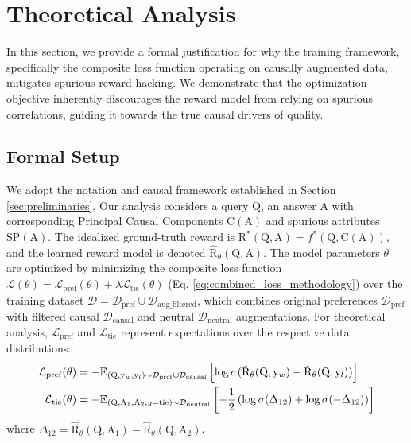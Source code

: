 \section{Theoretical Analysis}
\label{sec:theoretical_analysis_detailed}

In this section, we provide a formal justification for why the \carma{} training framework, specifically the composite loss function operating on causally augmented data, mitigates spurious reward hacking. We demonstrate that the optimization objective inherently discourages the reward model from relying on spurious correlations, guiding it towards the true causal drivers of quality.

\subsection{Formal Setup}
\label{subsec:theory_setup}

We adopt the notation and causal framework established in Section \ref{sec:preliminaries}. Our analysis considers a query $\mathrm{Q}$, an answer $\mathrm{A}$ with corresponding Principal Causal Components $\mathrm{C}(\mathrm{A})$ and spurious attributes $\mathrm{SP}(\mathrm{A})$. The idealized ground-truth reward is $\mathrm{R}^*(\mathrm{Q}, \mathrm{A}) = f^*(\mathrm{Q}, \mathrm{C}(\mathrm{A}))$, and the learned reward model is denoted $\hat{\mathrm{R}}_{\theta}(\mathrm{Q}, \mathrm{A})$. The model parameters $\theta$ are optimized by minimizing the composite loss function $\mathcal{L}(\theta) = \mathcal{L}_{\mathrm{pref}}(\theta) + \lambda \mathcal{L}_{\mathrm{tie}}(\theta)$ (Eq. \ref{eq:combined_loss_methodology}) over the training dataset $\mathcal{D} = \mathcal{D}_{\mathrm{pref}} \cup \mathcal{D}_{\mathrm{aug\_filtered}}$, which combines original preferences $\mathcal{D}_{\mathrm{pref}}$ with filtered causal $\mathcal{D}_{\mathrm{causal}}$ and neutral $\mathcal{D}_{\mathrm{neutral}}$ augmentations. For theoretical analysis, $\mathcal{L}_{\mathrm{pref}}$ and $\mathcal{L}_{\mathrm{tie}}$ represent expectations over the respective data distributions:
\begin{align*}
\mathcal{L}_{\mathrm{pref}}(\theta) &= - \mathbb{E}_{(\mathrm{Q}, \mathrm{y}_w, \mathrm{y}_l) \sim \mathcal{D}_{\mathrm{pref}} \cup \mathcal{D}_{\mathrm{causal}}} \left[ \log \sigmoid(\hat{\mathrm{R}}_\theta(\mathrm{Q}, \mathrm{y}_w) - \hat{\mathrm{R}}_\theta(\mathrm{Q}, \mathrm{y}_l)) \right] \\
\mathcal{L}_{\mathrm{tie}}(\theta) &= - \mathbb{E}_{(\mathrm{Q}, \mathrm{A}_1, \mathrm{A}_2, y=\text{tie}) \sim \mathcal{D}_{\mathrm{neutral}}} \left[ -\frac{1}{2} \left( \log \sigmoid(\Delta_{12}) + \log \sigmoid(-\Delta_{12}) \right) \right]
\end{align*}
where $\Delta_{12} = \hat{\mathrm{R}}_\theta(\mathrm{Q}, \mathrm{A}_1) - \hat{\mathrm{R}}_\theta(\mathrm{Q}, \mathrm{A}_2)$.


